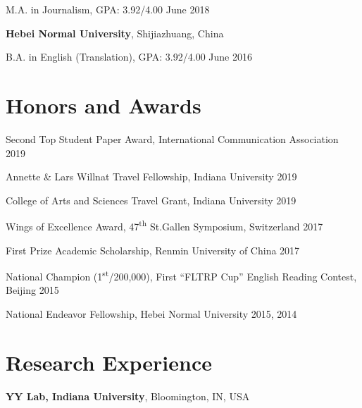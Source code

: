 \documentclass[margin,line, 10pt]{res}
\begin{document}
\begin{resume}
\vspace{-0.4cm}
M.A. in Journalism, GPA: 3.92/4.00 \hfill {June 2018}

{\bf Hebei Normal University}, Shijiazhuang, China

\vspace{-0.4cm}
B.A. in English (Translation), GPA: 3.92/4.00 \hfill {June 2016}

\section{\sc Honors and Awards} 
Second Top Student Paper Award, International Communication Association \hfill 2019

\vspace*{-2.5mm}
Annette \& Lars Willnat Travel Fellowship, Indiana University \hfill 2019

\vspace*{-2.5mm}
College of Arts and Sciences Travel Grant, Indiana University \hfill 2019

\vspace*{-2.5mm}
Wings of Excellence Award, 47\textsuperscript{th} St.Gallen Symposium, Switzerland \hfill 2017

\vspace*{-2.5mm}
First Prize Academic Scholarship, Renmin University of China \hfill 2017

\vspace*{-2.5mm}
\hspace{-2em} \faTrophy \hspace{.5em} National Champion (1\textsuperscript{st}/200,000), First ``FLTRP Cup” English Reading Contest, Beijing \hfill 2015

\vspace*{-2.5mm}
National Endeavor Fellowship, Hebei Normal University \hfill 2015, 2014

\section{\sc Research Experience}
{\bf YY Lab, Indiana University}, Bloomington, IN, USA


\end{resume}
\end{document}
